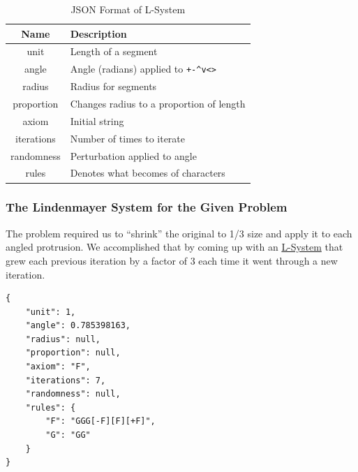 \begin{table}
    \begin{center}
        \begin{tabular}{| c | l |}
            \hline
            \textbf{Name} & \textbf{Description}                              \\ \hline
            unit          & Length of a segment                               \\ \hline
            angle         & Angle (radians) applied to \verb|+-^v<>| \\ \hline
            radius        & Radius for segments                               \\ \hline
            proportion    & Changes radius to a proportion of length          \\ \hline
            axiom         & Initial string                                    \\ \hline
            iterations    & Number of times to iterate                        \\ \hline
            randomness    & Perturbation applied to angle                     \\ \hline
            rules         & Denotes what becomes of characters                \\ \hline
        \end{tabular}
        \caption{JSON Format of L-System}
        \label{table:json_format}
    \end{center}
\end{table}


\subsubsection{The Lindenmayer System for the Given Problem}
The problem required us to ``shrink'' the original to 1/3 size and apply it to
each angled protrusion. We accomplished that by coming up with an
\hyperref[code:prob1_json]{L-System} that grew each previous iteration by a
factor of 3 each time it went through a new iteration.

\begin{verbatim}
{
    "unit": 1,
    "angle": 0.785398163,
    "radius": null,
    "proportion": null,
    "axiom": "F",
    "iterations": 7,
    "randomness": null,
    "rules": {
        "F": "GGG[-F][F][+F]",
        "G": "GG"
    }
}
\end{verbatim}
\label{code:prob1_json}

